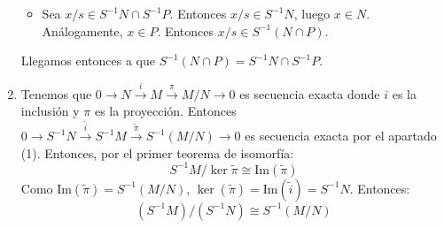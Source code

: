 \documentclass[twoside]{article}
\begin{document}
\begin{solucion}
\begin{enumerate}
\begin{itemize}
		\item Sea $x/s \in S^{-1}N \cap S^{-1}P$. Entonces $x/s \in S^{-1}N$, luego $x \in N$. Análogamente, $x \in P$. Entonces $x/s \in S^{-1}(N \cap P)$.
	\end{itemize}
	Llegamos entonces a que $S^{-1}(N \cap P) = S^{-1}N \cap S^{-1}P$.

	\item Tenemos que $0 \to N \xrightarrow{i} M \xrightarrow{π} M/N \to 0$ es secuencia exacta donde $i$ es la inclusión y $π$ es la proyección. Entonces $0 \to S^{-1}N \xrightarrow{\tilde{i}} S^{-1}M \xrightarrow{\tilde{π}} S^{-1}(M/N) \to 0$ es secuencia exacta por el apartado (1). Entonces, por el primer teorema de isomorfía:
	\[ S^{-1}M/\ker \tilde{π} \cong \text{Im}(\tilde{π}) \]
	Como $\text{Im}(\tilde{π}) = S^{-1}(M/N)$, $\ker(\tilde{π}) = \text{Im}(\tilde{i}) = S^{-1}N$. Entonces:
	\[ (S^{-1}M)/(S^{-1}N) \cong S^{-1}(M/N) \]
\end{enumerate}
\end{solucion}
\end{document}
